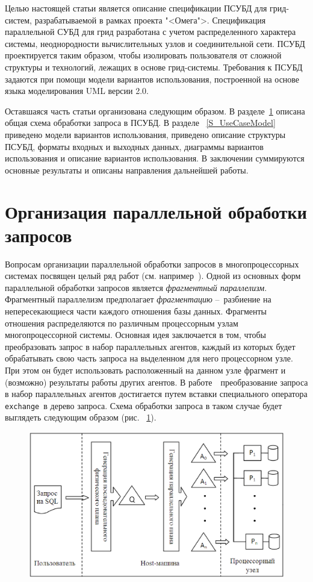 \documentclass[11pt,oneside]{article}
\begin{document}
	\par Целью настоящей статьи является описание спецификации ПСУБД для грид-систем, разрабатываемой в рамках проекта "<Омега">\cite{B_OMEGA}. Спецификация параллельной СУБД для грид разработана с учетом распределенного характера системы, неоднородности вычислительных узлов и соединительной сети. ПСУБД проектируется таким образом, чтобы изолировать пользователя от сложной структуры и технологий, лежащих в основе грид-системы. Требования к ПСУБД задаются при помощи модели вариантов использования, построенной на основе языка моделирования UML версии 2.0.
	\par Оставшаяся часть статьи организована следующим образом. В разделе~\ref{S_ParQueryProcessing} описана общая схема обработки запроса в ПСУБД. В разделе ~\ref{S_UseCaseModel} приведено модели вариантов использования, приведено описание структуры ПСУБД, форматы входных и выходных данных, диаграммы вариантов использования и описание вариантов использования. В заключении суммируются основные результаты и описаны направления дальнейшей работы.
	
	\section{Организация параллельной обработки запросов}\label{S_ParQueryProcessing}
	\par Вопросам организации параллельной обработки запросов в многопроцессорных системах посвящен целый ряд работ (см. например~\cite{B_Sokolinsky2001, B_Aloisio2005, B_Dutra2004}). Одной из основных форм параллельной обработки запросов является \textit{фрагментный параллелизм}. Фрагментный параллелизм предполагает \textit{фрагментацию} \---~разбиение на непересекающиеся части каждого отношения базы данных. Фрагменты отношения распределяются по различным процессорным узлам многопроцессорной системы. Основная идея заключается в том, чтобы преобразовать запрос в набор параллельных агентов, каждый из которых будет обрабатывать свою часть запроса на выделенном для него процессорном узле. При этом он будет использовать расположенный на данном узле фрагмент и (возможно) результаты работы других агентов. В работе~\cite{B_Sokolinsky2001}~преобразование запроса в набор параллельных агентов достигается путем вставки специального оператора \texttt{exchange}~в дерево запроса. Схема обработки запроса в таком случае будет выглядеть следующим образом (рис. ~\ref{fig:qexec}).
	
	\begin{figure}[h]
		\centering
		\includegraphics[width=0.7\linewidth]{qexec}
		\caption{}
		\label{fig:qexec}
	\end{figure}	
	
\end{document}
